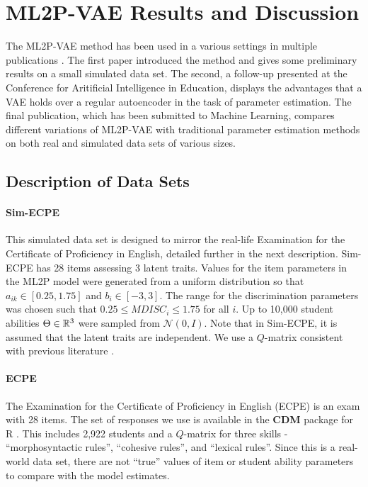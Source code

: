\chapter{ML2P-VAE Results and Discussion}

The ML2P-VAE method has been used in a various settings in multiple publications \cite{ijcnn_paper, aied_paper, ml_paper}. The first paper introduced the method and gives some preliminary results on a small simulated data set. The second, a follow-up presented at the Conference for Aritificial Intelligence in Education, displays the advantages that a VAE holds over a regular autoencoder in the task of parameter estimation. The final publication, which has been submitted to Machine Learning, compares different variations of ML2P-VAE with traditional parameter estimation methods on both real and simulated data sets of various sizes.

\section{Description of Data Sets}
\subsubsection*{Sim-ECPE} This simulated data set is designed to mirror the real-life Examination for the Certificate of Proficiency in English, detailed further in the next description. Sim-ECPE has 28 items assessing 3 latent traits. Values for the item parameters in the ML2P model were generated from a uniform distribution so that $a_{ik} \in [0.25, 1.75]$ and $b_i \in [-3,3]$. The range for the discrimination parameters was chosen such that $0.25 \leq MDISC_i \leq 1.75$  for all $i$. Up to 10,000 student abilities $\Theta \in \mathbb{R}^3$ were sampled from $\mathcal{N}(0,I)$. Note that in Sim-ECPE, it is assumed that the latent traits are independent. We use a $Q$-matrix consistent with previous literature \cite{daSilva2018, Templin2013, henson2007}.

\subsubsection*{ECPE} The Examination for the Certificate of Proficiency in English (ECPE) is an exam with 28 items. The set of responses we use is available in the \textbf{CDM} package for R \cite{cdm}. This includes 2,922 students and a $Q$-matrix for three skills - ``morphosyntactic rules'', ``cohesive rules'', and ``lexical rules''. Since this is a real-world data set, there are not ``true'' values of item or student ability parameters to compare with the model estimates.

